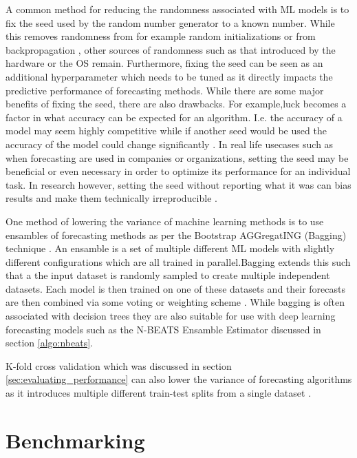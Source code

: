 A common method for reducing the randomness associated with ML models is to fix the seed used by the random number generator to a known number. While this removes randomness from for example random initializations or from backpropagation \cite{beam2020challenges}, other sources of randomness such as that introduced by the hardware or the OS remain. Furthermore, fixing the seed can be seen as an additional hyperparameter which needs to be tuned as it directly impacts the predictive performance of forecasting methods. While there are some major benefits of fixing the seed, there are also drawbacks. For example,luck becomes a factor in what accuracy can be expected for an algorithm. I.e. the accuracy of a model may seem highly competitive while if another seed would be used the accuracy of the model could change significantly \cite{beam2020challenges}. In real life usecases such as when forecasting are used in companies or organizations, setting the seed may be beneficial or even necessary in order to optimize its performance for an individual task. In research however, setting the seed without reporting what it was can bias results and make them technically irreproducible \cite{beam2020challenges,pineau2020improving,bouthillier2021accounting}.

One method of lowering the variance of machine learning methods is to use ensambles of forecasting methods as per the Bootstrap AGGregatING (Bagging) technique \cite{buhlmann2002analyzing}. An ensamble is a set of multiple different ML models with slightly different configurations which are all trained in parallel.Bagging extends this such that a the input dataset is randomly sampled to create multiple independent datasets. Each model is then trained on one of these datasets and their forecasts are then combined via some voting or weighting scheme \cite{buhlmann2002analyzing}. While bagging is often associated with decision trees they are also suitable for use with deep learning forecasting models such as the N-BEATS Ensamble Estimator discussed in section \ref{algo:nbeats}.

K-fold cross validation which was discussed in section \ref{sec:evaluating_performance} can also lower the variance of forecasting algorithms as it introduces multiple different train-test splits from a single dataset \cite{buhlmann2002analyzing}.

\section{Benchmarking}
\label{sec:related_work}

